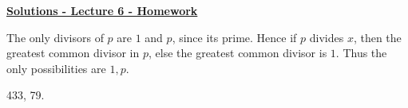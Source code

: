\documentclass[12pt]{article} %
\theoremstyle{ex}
\begin{document}
	\renewcommand*{\coursecode}{MATH 235} %
	\renewcommand*{\assgnnumber}{Assignment 1} %
	\renewcommand*{\submdate}{September 14, 2021} %
	\renewcommand*{\studentfname}{Abdullah} %
	\renewcommand*{\studentlname}{Zubair} %
    \renewcommand*{\proofname}{Proof:}

	\renewcommand\qedsymbol{$\blacksquare$}
	\setfigpath
	\fancyhfoffset[L,O]{0pt} %




\begin{center}
		\Huge{\underline{\textbf{Solutions - Lecture 6 - Homework}}}
\end{center}
\begin{qstn}
  \begin{solution}
    The only divisors of $p$ are $1$ and $p$, since its prime. Hence if $p$ divides $x$, then the greatest common
    divisor in $p$, else the greatest common divisor is $1$. Thus the only possibilities are $1,p$.
  \end{solution}
\end{qstn}

\begin{qstn}
  \begin{solution}
    433, 79.
  \end{solution}
\end{qstn}
\end{document}
